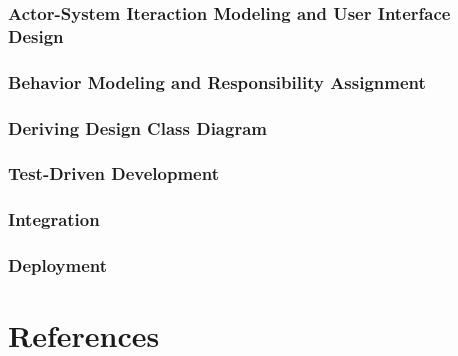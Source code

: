 \documentclass[11pt]{article}
\begin{document}
\subsubsection{Actor-System Iteraction Modeling and User Interface Design}

\subsubsection{Behavior Modeling and Responsibility Assignment}

\subsubsection{Deriving Design Class Diagram}

\subsubsection{Test-Driven Development}

\subsubsection{Integration}

\subsubsection{Deployment}

\section{References}


\end{document}
